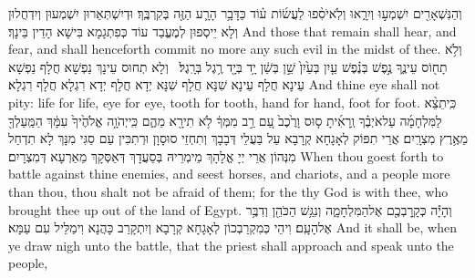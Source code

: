 {וְהַנִּשְׁאָרִ֖ים יִשְׁמְע֣וּ וְיִרָ֑אוּ וְלֹֽא\maqqaf יֹסִ֨פוּ לַעֲשׂ֜וֹת ע֗וֹד כַּדָּבָ֥ר הָרָ֛ע הַזֶּ֖ה בְּקִרְבֶּֽךָ׃}
{וּדְיִשְׁתְּאַרוּן יִשְׁמְעוּן וְיִדְחֲלוּן וְלָא יֵיסְפוּן לְמֶעֱבַד עוֹד כְּפִתְגָמָא בִּישָׁא הָדֵין בֵּינָךְ׃}
{And those that remain shall hear, and fear, and shall henceforth commit no more any such evil in the midst of thee.}{}
{וְלֹ֥א תָח֖וֹס עֵינֶ֑ךָ נֶ֣פֶשׁ בְּנֶ֗פֶשׁ עַ֤יִן בְּעַ֙יִן֙ שֵׁ֣ן בְּשֵׁ֔ן יָ֥ד בְּיָ֖ד רֶ֥גֶל בְּרָֽגֶל׃ \setuma }
{וְלָא תְחוּס עֵינָךְ נַפְשָׁא חֲלָף נַפְשָׁא עֵינָא חֲלָף עֵינָא שִׁנָּא חֲלָף שִׁנָּא יְדָא חֲלָף יְדָא רִגְלָא חֲלָף רִגְלָא׃}
{And thine eye shall not pity: life for life, eye for eye, tooth for tooth, hand for hand, foot for foot.}{}
\newperek
{}%
{כִּֽי\maqqaf תֵצֵ֨א לַמִּלְחָמָ֜ה עַל\maqqaf אֹיְבֶ֗ךָ וְֽרָאִ֜יתָ ס֤וּס וָרֶ֙כֶב֙ עַ֚ם רַ֣ב מִמְּךָ֔ לֹ֥א תִירָ֖א מֵהֶ֑ם כִּֽי\maqqaf יְהֹוָ֤ה אֱלֹהֶ֙יךָ֙ עִמָּ֔ךְ הַמַּֽעַלְךָ֖ מֵאֶ֥רֶץ מִצְרָֽיִם׃}
{אֲרֵי תִפּוֹק לְאָגָחָא קְרָבָא עַל בַּעֲלֵי דְּבָבָךְ וְתִחְזֵי סוּסָוָן וּרְתִכִּין עַם סַגִּי מִנָּךְ לָא תִדְחַל מִנְּהוֹן אֲרֵי יְיָ אֱלָהָךְ מֵימְרֵיהּ בְּסַעֲדָךְ דְּאַסְּקָךְ מֵאַרְעָא דְּמִצְרָיִם׃}
{When thou goest forth to battle against thine enemies, and seest horses, and chariots, and a people more than thou, thou shalt not be afraid of them; for the \lord\space thy God is with thee, who brought thee up out of the land of Egypt.}{}
{וְהָיָ֕ה כְּקָֽרׇבְכֶ֖ם אֶל\maqqaf הַמִּלְחָמָ֑ה וְנִגַּ֥שׁ הַכֹּהֵ֖ן וְדִבֶּ֥ר אֶל\maqqaf הָעָֽם׃}
{וִיהֵי כְּמִקְרַבְכוֹן לְאָגָחָא קְרָבָא וְיִתְקָרַב כָּהֲנָא וִימַלֵּיל עִם עַמָּא׃}
{And it shall be, when ye draw nigh unto the battle, that the priest shall approach and speak unto the people,}{}
